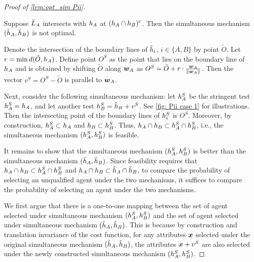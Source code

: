 \begin{proof}[Proof of \cref{lem:opt_sim Pii}]
    \begin{claim}\label{claim:Pii optimal sim not parallel case 1 b}
        Suppose $\tilde{L}_A$ intersects with $h_A$ at $(h_A\cap h_B)^{\textsc{c}}$. Then the simultaneous mechanism $(\tilde{h}_A,\tilde{h}_B)$ is not optimal.
    \end{claim}
    




    
Denote the intersection of the boundary lines of $\tilde{h}_i$, $i\in \{A,B\}$ by point $\tilde O$.
Let $r=\min d(\tilde O,h_A)$.
Define point $O^S$ as the point that lies on the boundary line of $h_A$ and is obtained by shifting $\tilde O$ along $\boldsymbol{w}_A$ as $O^S= \tilde O+r\cdot \frac{\boldsymbol{w}_A}{\lVert \boldsymbol{w}_A \rVert }$.
Then the vector $v^S = O^S- \tilde O$ is parallel to $\boldsymbol{w}_A$.
    
    Next, consider the following simultaneous mechanism: 
    let $h_A^S$ be the stringent test $h_A^S=h_A$, and let another test $h_B^S =\tilde{h}_B+v^S$.
    See \cref{fig: Pii case 1} for illustrations.
    Then the intersecting point of the boundary lines of $h_i^S$ is $O^S$.
    Moreover, by construction, $h_A^S\subset h_A$ and $h_B\subset h_B^S$.
    Thus, $h_A\cap h_B\subset h_A^S\cap h_B^S$, i.e., the simultaneous mechanism $(h_A^S,h_B^S)$ is feasible. 


    It remains to show that the simultaneous mechanism $(h_A^S,h_B^S)$ is better than the simultaneous mechanism $(\tilde{h}_A,\tilde{h}_B)$.
    Since feasibility requires that $h_A\cap h_B\subset h_A^S\cap h_B^S$ and $h_A\cap h_B\subset \tilde{h}_A\cap\tilde{h}_B$, to compare the probability of selecting an unqualified agent under the two mechanisms, it suffices to compare the probability of selecting an agent under the two mechanisms.
   

   We first argue that there is a one-to-one mapping between the set of agent selected under simultaneous mechanism $(h_A^S,h_B^S)$ and the set of agent selected under simultaneous mechanism $(\tilde{h}_A,\tilde{h}_B)$.
    This is because by construction and translation invariance of the cost function, for any attributes $\boldsymbol{x}$ selected under the original simultaneous mechanism $(\tilde{h}_A,\tilde{h}_B)$, the attributes $\boldsymbol{x}+v^S$ are also selected under the newly constructed simultaneous mechanism $(h_A^S,h_B^S)$.


\end{proof}
